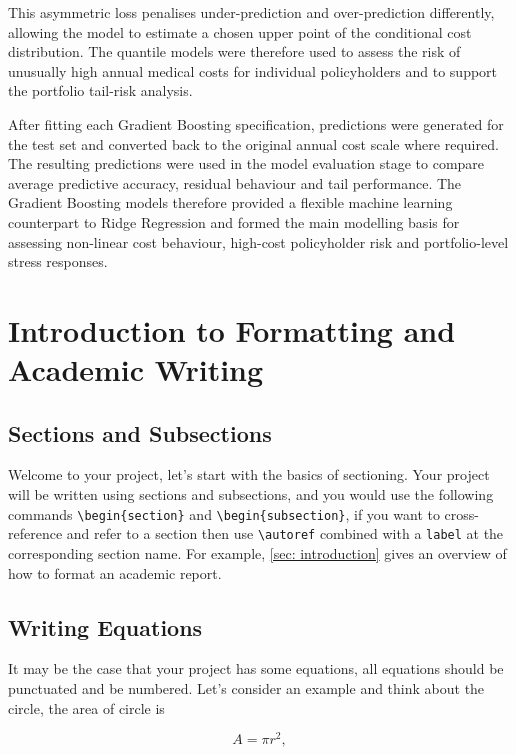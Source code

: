 \documentclass[11pt]{article}
\begin{document}
	This asymmetric loss penalises under-prediction and over-prediction differently, allowing the model to estimate a chosen upper point of the conditional cost distribution. The quantile models were therefore used to assess the risk of unusually high annual medical costs for individual policyholders and to support the portfolio tail-risk analysis.
	
	After fitting each Gradient Boosting specification, predictions were generated for the test set and converted back to the original annual cost scale where required. The resulting predictions were used in the model evaluation stage to compare average predictive accuracy, residual behaviour and tail performance. The Gradient Boosting models therefore provided a flexible machine learning counterpart to Ridge Regression and formed the main modelling basis for assessing non-linear cost behaviour, high-cost policyholder risk and portfolio-level stress responses.
	
    \section{Introduction to Formatting and Academic Writing}\label{sec: introduction}

    \subsection{Sections and Subsections}

    Welcome to your project, let's start with the basics of sectioning. Your project will be written using sections and subsections, and you would use the following commands \verb!\begin{section}! and  \verb!\begin{subsection}!, if you want to cross-reference and refer to a section then use \verb!\autoref! combined with a \texttt{label} at the corresponding section name. For example, \autoref{sec: introduction} gives an overview of how to format an academic report.

    \subsection{Writing Equations}
    It may be the case that your project has some equations, all equations should be punctuated and be numbered. Let's consider an example and think about the circle, the area of circle is

    \begin{equation}\label{eq:circle}
        A=\pi r^2,
    \end{equation}
\end{document}
